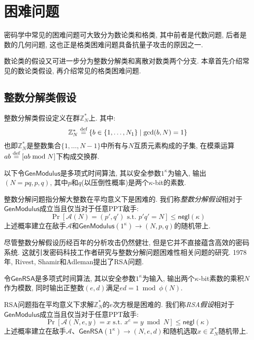 \section{困难问题}
密码学中常见的困难问题可大致分为数论类和格类, 其中前者是代数问题, 后者是数的几何问题, 
这也正是格类困难问题具备抗量子攻击的原因之一. 

数论类的假设又可进一步分为整数分解类和离散对数类两个分支. 本章首先介绍常见的数论类假设, 再介绍常见的格类困难问题. 

\subsection{整数分解类假设}
整数分解类假设定义在群$\mathbb{Z}_N^*$上. 其中:
\begin{equation*}
\mathbb{Z}_N^* \stackrel{\textup{def}}{=} \{b \in \{1, \dots, N_1\} \mid \text{gcd}(b, N)=1\}
\end{equation*}
也即$\mathbb{Z}_N^*$是整数集合$\{1, \dots, N-1\}$中所有与$N$互质元素构成的子集, 
在模乘运算$ab \stackrel{\textup{def}}{=} [ab \bmod N]$下构成交换群.  

以下令$\mathsf{GenModulus}$是多项式时间算法, 其以安全参数$1^\kappa$为输入, 输出$(N=pq, p, q)$, 
其中$p$和$q$(以压倒性概率)是两个$\kappa$-bit的素数. 

\begin{definition}[整数分解假设]
整数分解问题指分解大整数在平均意义下是困难的. 我们称\emph{整数分解假设}相对于$\mathsf{GenModulus}$成立当且仅当对于任意PPT敌手: 
\begin{equation*}
\Pr[\mathcal{A}(N) = (p', q') \text{~s.t.~} p'q' = N] \leq \mathsf{negl}(\kappa)
\end{equation*} 	
上述概率建立在敌手$\mathcal{A}$和$\mathsf{GenModulus}(1^\kappa) \rightarrow (N, p, q)$的随机带上. 
\end{definition}

尽管整数分解假设历经百年的分析攻击仍然健壮, 但是它并不直接蕴含高效的密码系统. 
这就引发密码科技工作者研究与整数分解问题困难性相关问题的研究. 1978年, Rivest, Shamir和Adleman提出了RSA问题. 

令$\mathsf{GenRSA}$是多项式时间算法, 其以安全参数$1^\kappa$为输入, 
输出两个$\kappa$-bit素数的乘积$N$作为模数, 同时输出正整数$(e, d)$满足$ed = 1 \bmod \phi(N)$. 

\begin{definition}[RSA假设]
RSA问题指在平均意义下求解$\mathbb{Z}_N^*$的$e$次方根是困难的. 
我们称\emph{RSA假设}相对于$\mathsf{GenModulus}$成立当且仅当对于任意PPT敌手:
\begin{equation*}
\Pr[\mathcal{A}(N, e, y) = x \text{~s.t.~} x^e = y \bmod N] \leq \mathsf{negl}(\kappa)
\end{equation*} 	
上述概率建立在敌手$\mathcal{A}$、$\mathsf{GenRSA}(1^\kappa) \rightarrow (N, e, d)$和随机选取$x \in \mathbb{Z}_N^*$随机带上. 
\end{definition}

